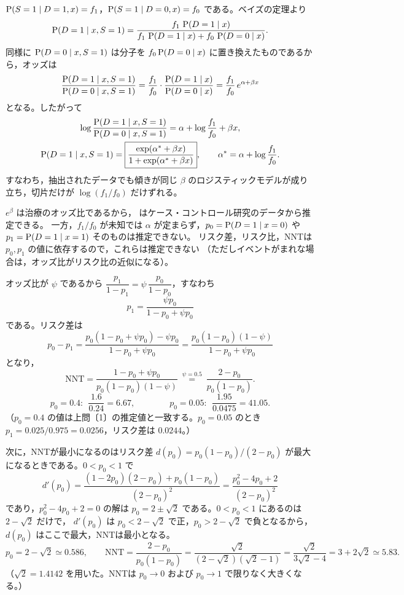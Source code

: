 \documentclass[a4paper,11pt]{ltjsarticle}
\begin{document}
$\operatorname{P}(S=1\mid D=1,x)=f_1$，$\operatorname{P}(S=1\mid D=0,x)=f_0$ である。ベイズの定理より
\[
\operatorname{P}(D=1\mid x,S=1)=\frac{f_1\,\operatorname{P}(D=1\mid x)}{f_1\,\operatorname{P}(D=1\mid x)+f_0\,\operatorname{P}(D=0\mid x)}.
\]
同様に $\operatorname{P}(D=0\mid x,S=1)$ は分子を $f_0\operatorname{P}(D=0\mid x)$ に置き換えたものであるから，オッズは
\[
\frac{\operatorname{P}(D=1\mid x,S=1)}{\operatorname{P}(D=0\mid x,S=1)}=\frac{f_1}{f_0}\cdot\frac{\operatorname{P}(D=1\mid x)}{\operatorname{P}(D=0\mid x)}=\frac{f_1}{f_0}\,e^{\alpha+\beta x}
\]
となる。したがって
\begin{gather*}
\log\frac{\operatorname{P}(D=1\mid x,S=1)}{\operatorname{P}(D=0\mid x,S=1)}=\alpha+\log\frac{f_1}{f_0}+\beta x,\\
\operatorname{P}(D=1\mid x,S=1)=\boxed{\frac{\exp(\alpha^*+\beta x)}{1+\exp(\alpha^*+\beta x)}},\qquad \alpha^*=\alpha+\log\frac{f_1}{f_0}.
\end{gather*}
すなわち，抽出されたデータでも傾きが同じ $\beta$ のロジスティックモデルが成り立ち，切片だけが $\log(f_1/f_0)$ だけずれる。

$e^\beta$ は治療のオッズ比であるから， はケース・コントロール研究のデータから推定できる。
一方，$f_1/f_0$ が未知では $\alpha$ が定まらず，$p_0=\operatorname{P}(D=1\mid x=0)$ や $p_1=\operatorname{P}(D=1\mid x=1)$ そのものは推定できない。
リスク差，リスク比，NNTは $p_0,p_1$ の値に依存するので，これらは推定できない
（ただしイベントがまれな場合は，オッズ比がリスク比の近似になる）。

オッズ比が $\psi$ であるから $\dfrac{p_1}{1-p_1}=\psi\,\dfrac{p_0}{1-p_0}$，すなわち
\[
p_1=\frac{\psi p_0}{1-p_0+\psi p_0}
\]
である。リスク差は
\[
p_0-p_1=\frac{p_0(1-p_0+\psi p_0)-\psi p_0}{1-p_0+\psi p_0}=\frac{p_0(1-p_0)(1-\psi)}{1-p_0+\psi p_0}
\]
となり，
\[
\mathrm{NNT}=\frac{1-p_0+\psi p_0}{p_0(1-p_0)(1-\psi)}\ \overset{\psi=0.5}{=}\ \boxed{\frac{2-p_0}{p_0(1-p_0)}}.
\]
\[
p_0=0.4:\ \ \frac{1.6}{0.24}=\boxed{6.67},\qquad\qquad
p_0=0.05:\ \ \frac{1.95}{0.0475}=\boxed{41.05}.
\]
（$p_0=0.4$ の値は上問〔1〕の推定値と一致する。$p_0=0.05$ のとき $p_1=0.025/0.975=0.0256$，リスク差は $0.0244$。）

次に，NNTが最小になるのはリスク差 $d(p_0)=p_0(1-p_0)/(2-p_0)$ が最大になるときである。$0<p_0<1$ で
\[
d'(p_0)=\frac{(1-2p_0)(2-p_0)+p_0(1-p_0)}{(2-p_0)^2}=\frac{p_0^2-4p_0+2}{(2-p_0)^2}
\]
であり，$p_0^2-4p_0+2=0$ の解は $p_0=2\pm\sqrt2$ である。$0<p_0<1$ にあるのは $2-\sqrt2$ だけで，
$d'(p_0)$ は $p_0<2-\sqrt2$ で正，$p_0>2-\sqrt2$ で負となるから，$d(p_0)$ はここで最大，NNTは最小となる。
\[
p_0=2-\sqrt2\simeq\boxed{0.586},\qquad
\mathrm{NNT}=\frac{2-p_0}{p_0(1-p_0)}=\frac{\sqrt2}{(2-\sqrt2)(\sqrt2-1)}=\frac{\sqrt2}{3\sqrt2-4}=3+2\sqrt2\simeq\boxed{5.83}.
\]
（$\sqrt2=1.4142$ を用いた。NNTは $p_0\to0$ および $p_0\to1$ で限りなく大きくなる。）
\end{document}
